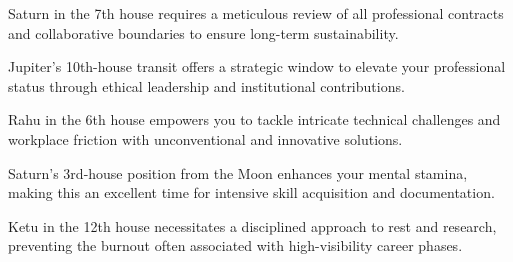 \begin{diamondlist}
  \item {\fontsize{8.5}{12}\selectfont Saturn in the 7th house requires a meticulous review of all professional contracts and collaborative boundaries to ensure long-term sustainability.}
  \item {\fontsize{8.5}{12}\selectfont Jupiter's 10th-house transit offers a strategic window to elevate your professional status through ethical leadership and institutional contributions.}
  \item {\fontsize{8.5}{12}\selectfont Rahu in the 6th house empowers you to tackle intricate technical challenges and workplace friction with unconventional and innovative solutions.}
  \item {\fontsize{8.5}{12}\selectfont Saturn's 3rd-house position from the Moon enhances your mental stamina, making this an excellent time for intensive skill acquisition and documentation.}
  \item {\fontsize{8.5}{12}\selectfont Ketu in the 12th house necessitates a disciplined approach to rest and research, preventing the burnout often associated with high-visibility career phases.}
\end{diamondlist}


